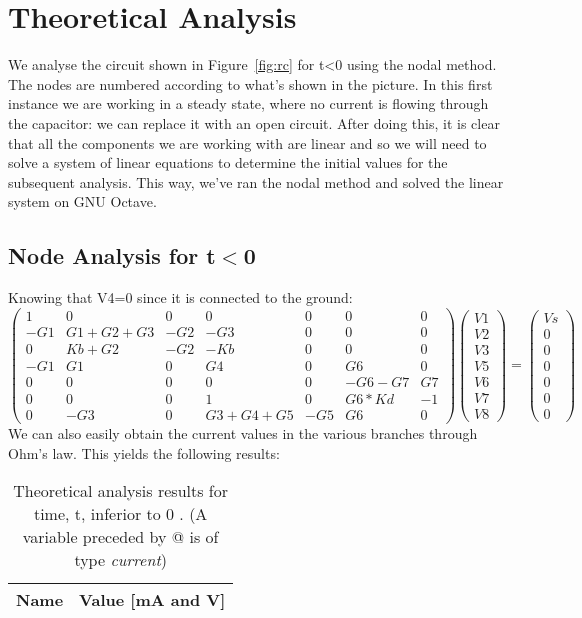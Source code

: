 \section{Theoretical Analysis}
\label{sec:analysis}

We analyse the circuit shown in Figure~\ref{fig:rc} for t<0 using the nodal method.
The nodes are numbered according to what's shown in the picture.
In this first instance we are working in a steady state, where no current is flowing through the capacitor: we can replace it with an open circuit.
After doing this, it is clear that all the components we are working with are linear and so we will need to solve a system of linear equations to determine the initial values for the subsequent analysis.
This way, we’ve ran the nodal method and solved the linear system on GNU Octave.
\subsection{Node Analysis for t$<$0}
Knowing that V4=0 since it is connected to the ground:
\begin{equation}
\begin{pmatrix}
1 & 0 & 0 & 0 & 0 & 0 & 0\\
-G1 & G1+G2+G3 & -G2 & -G3 & 0 & 0 & 0\\
0 & Kb+G2 & -G2 & -Kb & 0 & 0 & 0\\
-G1 & G1 & 0 & G4 & 0 & G6 & 0\\
0 & 0 & 0 & 0 & 0 & -G6-G7 & G7\\
0 & 0 & 0 & 1 & 0 & G6*Kd & -1\\
0 & -G3 & 0 & G3+G4+G5 & -G5 & G6 & 0
\end{pmatrix}
\begin{pmatrix}
V1\\
V2\\
V3\\
V5\\
V6\\
V7\\
V8
\end{pmatrix}
=
\begin{pmatrix}
Vs\\
0\\
0\\
0\\
0\\
0\\
0
\end{pmatrix}
\end{equation}
We can also easily obtain the current values in the various branches through Ohm's law. This yields the following results:
\begin{table}[h]
  \centering
  \begin{tabular}{|l|r|}
    \hline    
    {\bf Name} & {\bf Value [mA and V]} \\ \hline
     
  \end{tabular}
  \caption{Theoretical analysis results for time, t, inferior to 0 . (A variable preceded by @ is of type {\em current})}
  \label{tab:nodal}
\end{table}

